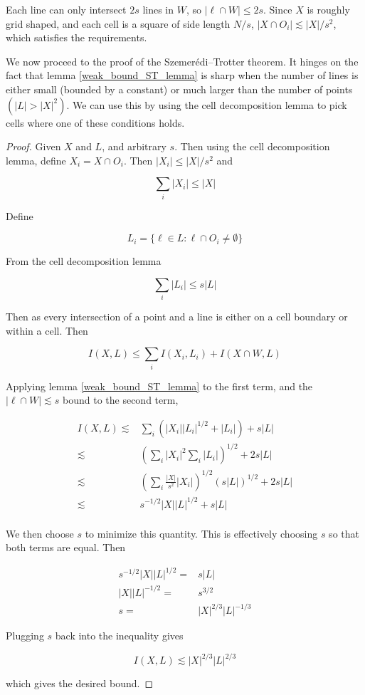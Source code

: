 \documentclass[12pt]{amsart}
\begin{document}
Each line can only intersect $2s$ lines in $W$, so $|\ell \cap W| \leq 2s$. Since $X$ is roughly grid shaped, and each cell is a square of side length $N/s$, $|X\cap O_i| \lesssim |X|/s^2$, which satisfies the requirements. 

We now proceed to the proof of the Szemerédi–Trotter theorem. It hinges on the fact that lemma \ref{weak_bound_ST_lemma} is sharp when the number of lines is either small (bounded by a constant) or much larger than the number of points $(|L| > |X|^2)$. We can use this by using the cell decomposition lemma to pick cells where one of these conditions holds. 

\begin{proof}
Given $X$ and $L$, and arbitrary $s$. Then using the cell decomposition lemma, define $X_i = X \cap O_i$. Then $|X_i| \leq |X|/s^2$ and 

\[\sum_i |X_i| \leq |X|\] 

Define 

\[L_i = \{\ell \in L: \ell \cap O_i \neq \emptyset\}\]


From the cell decomposition lemma

\[\sum_i |L_i| \leq s |L|\]

Then as every intersection of a point and a line is either on a cell boundary or within a cell. Then 

\[I(X,L) \leq \sum_i I(X_i, L_i) + I(X\cap W, L)\] 

Applying lemma \ref{weak_bound_ST_lemma} to the first term, and the $|\ell \cap W| \lesssim s$ bound to the second term, 

\begin{align*}
    I(X,L) \lesssim & \sum_i (|X_i| |L_i|^{1/2} + |L_i|) + s|L|\\
    \lesssim & \left(\sum_i |X_i|^2 \sum_i |L_i|\right)^{1/2}+ 2s|L|\\
    \lesssim & \left(\sum_i \frac{|X|}{s^2} |X_i| \right)^{1/2}(s|L|)^{1/2} + 2s|L|\\
    \lesssim & s^{-1/2} |X| |L|^{1/2} + s|L|\\
\end{align*}

We then choose $s$ to minimize this quantity. This is effectively choosing $s$ so that both terms are equal. Then 

\begin{align*}
    s^{-1/2} |X| |L|^{1/2} = & s|L|\\
    |X||L|^{-1/2} = & s^{3/2}\\
    s = & |X|^{2/3} |L|^{-1/3}
\end{align*}

 Plugging $s$ back into the inequality gives 


\[I(X,L) \lesssim |X|^{2/3}|L|^{2/3}\]  

which gives the desired bound.
\end{proof}
\end{document}
